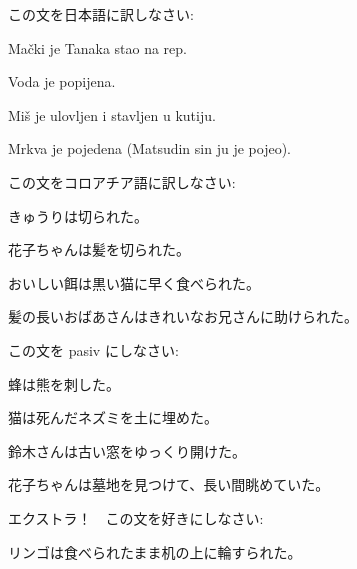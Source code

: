         \begin{reibun}
        \end{reibun}
        
        
        
\newpage

    	
    	\begin{mondai}{この文を日本語に訳しなさい:}
    	   \item Mački je Tanaka stao na rep.
    	   \item Voda je popijena.
    	   \item Miš je ulovljen i stavljen u kutiju.
    	   \item Mrkva je pojedena (Matsudin sin ju je pojeo). 
        \end{mondai}{}
    
        \begin{mondai}{この文をコロアチア語に訳しなさい:}
        	\item きゅうりは切られた。
        	\item 花子ちゃんは髪を切られた。
        	\item おいしい餌は黒い猫に早く食べられた。
        	\item 髪の長いおばあさんはきれいなお兄さんに助けられた。
        \end{mondai}
    
    	\begin{mondai}{この文を pasiv にしなさい:}
    		\item 蜂は熊を刺した。
    		\item 猫は死んだネズミを土に埋めた。
    		\item 鈴木さんは古い窓をゆっくり開けた。
    		\item 花子ちゃんは墓地を見つけて、長い間眺めていた。
    	\end{mondai}
    
        \begin{mondai}{ エクストラ！　この文を好きにしなさい: }
        	\item リンゴは食べられたまま机の上に輪すられた。 
        \end{mondai}
    
		
	
